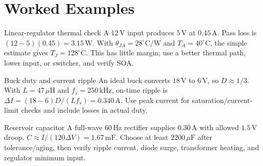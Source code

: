 \documentclass[10pt,letterpaper]{article}
\begin{document}
\section{Worked Examples}
\begin{CornellExamBox}{Linear-regulator thermal check}
A $12\,\mathrm{V}$ input produces $5\,\mathrm{V}$ at $0.45\,\mathrm{A}$. Pass loss is $(12-5)(0.45)=3.15\,\mathrm{W}$. With $\theta_{JA}=28^{\circ}\mathrm{C/W}$ and $T_A=40^{\circ}\mathrm{C}$, the simple estimate gives $T_J=128^{\circ}\mathrm{C}$. This has little margin; use a better thermal path, lower input, or switcher, and verify SOA.
\end{CornellExamBox}
\begin{CornellExamBox}{Buck duty and current ripple}
An ideal buck converts $18\,\mathrm{V}$ to $6\,\mathrm{V}$, so $D\approx1/3$. With $L=47\,\mu\mathrm{H}$ and $f_s=250\,\mathrm{kHz}$, on-time ripple is $\Delta I=(18-6)D/(Lf_s)=0.340\,\mathrm{A}$. Use peak current for saturation/current-limit checks and include losses in actual duty.
\end{CornellExamBox}
\begin{CornellExamBox}{Reservoir capacitor}
A full-wave $60\,\mathrm{Hz}$ rectifier supplies $0.30\,\mathrm{A}$ with allowed $1.5\,\mathrm{V}$ droop. $C\approx I/(120\Delta V)=1.67\,\mathrm{mF}$. Choose at least $2200\,\mu\mathrm{F}$ after tolerance/aging, then verify ripple current, diode surge, transformer heating, and regulator minimum input.
\end{CornellExamBox}
\end{document}
